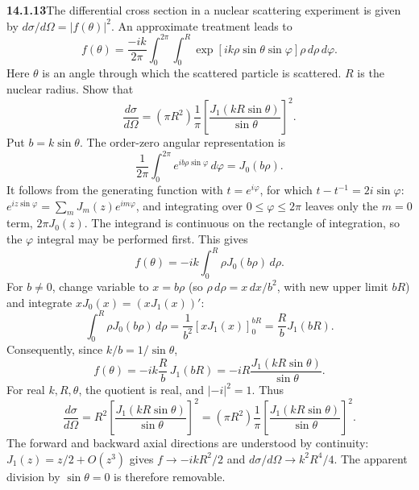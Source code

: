 \par\bigskip
\noindent\textbf{14.1.13}\quad The differential cross section in a nuclear
scattering experiment is given by $d\sigma/d\Omega=|f(\theta)|^{2}$.
An approximate treatment leads to
\[
f(\theta)=\frac{-ik}{2\pi}\int_{0}^{2\pi}\!\!\int_{0}^{R}
\exp[ik\rho\sin\theta\sin\varphi]\rho\,d\rho\,d\varphi.
\]
Here $\theta$ is an angle through which the scattered particle is
scattered. $R$ is the nuclear radius. Show that
\[
\frac{d\sigma}{d\Omega}=(\pi R^{2})\frac{1}{\pi}
\left[\frac{J_{1}(kR\sin\theta)}{\sin\theta}\right]^{2}.
\]
\solution
Put $b=k\sin\theta$. The order-zero angular representation is
\[
\frac1{2\pi}\int_0^{2\pi}e^{ib\rho\sin\varphi}\,d\varphi=J_0(b\rho).
\]
It follows from the generating function with $t=e^{i\varphi}$, for
which $t-t^{-1}=2i\sin\varphi$:
$e^{iz\sin\varphi}=\sum_mJ_m(z)e^{im\varphi}$, and integrating over
$0\le\varphi\le2\pi$ leaves only the $m=0$ term, $2\pi J_0(z)$.
The integrand is continuous on the rectangle of integration, so the
$\varphi$ integral may be performed first. This gives
\[
f(\theta)=-ik\int_0^R\rho J_0(b\rho)\,d\rho.
\]
For $b\ne0$, change variable to $x=b\rho$ (so
$\rho\,d\rho=x\,dx/b^2$, with new upper limit $bR$) and integrate
$xJ_0(x)=(xJ_1(x))'$:
\[
\int_0^R\rho J_0(b\rho)\,d\rho
=\frac1{b^2}\left[xJ_1(x)\right]_0^{bR}
=\frac{R}{b}J_1(bR).
\]
Consequently, since $k/b=1/\sin\theta$,
\[
f(\theta)=-ik\frac Rb\,J_1(bR)
=-iR\frac{J_1(kR\sin\theta)}{\sin\theta}.
\]
For real $k,R,\theta$, the quotient is real, and $|-i|^2=1$. Thus
\[
\boxed{\frac{d\sigma}{d\Omega}
=R^2\left[\frac{J_1(kR\sin\theta)}{\sin\theta}\right]^2
=(\pi R^2)\frac1\pi
\left[\frac{J_1(kR\sin\theta)}{\sin\theta}\right]^2.}
\]
The forward and backward axial directions are understood by continuity:
$J_1(z)=z/2+O(z^3)$ gives $f\to-ikR^2/2$ and
$d\sigma/d\Omega\to k^2R^4/4$. The apparent division by
$\sin\theta=0$ is therefore removable.

